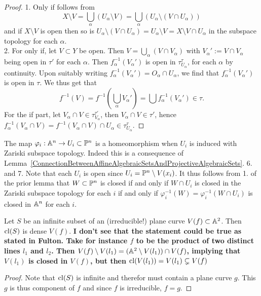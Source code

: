     \begin{proof}
        1. Only if follows from
        $$X\setminus V = \bigcup_\alpha (U_\alpha\setminus V)= \bigcup_\alpha (U_\alpha\setminus (V\cap U_\alpha))$$
        and if $X\setminus V$ is open then so is $U_\alpha\setminus (V\cap U_\alpha) = U_\alpha \setminus V = X\setminus V \cap U_\alpha$ in the subspace topology for each $\alpha$.\\
        2. For only if, let $V\subset Y$ be open. Then $V = \bigcup_\alpha (V\cap V_\alpha)$ with $V_\alpha':=V\cap V_\alpha$ being open in $\tau'$ for each $\alpha$. Then $f_\alpha^{-1}(V_\alpha')$ is open in $\tau_{U_\alpha}^\tau$, for each $\alpha$ by continuity. Upon suitably writing $f_\alpha^{-1}(V_\alpha')= O_\alpha\cap U_\alpha$, we find that $f_\alpha^{-1}(V_\alpha')$ is open in $\tau$. We thus get that
        $$f^{-1}(V)=f^{-1}\left(\bigcup_\alpha V_\alpha'\right)= \bigcup f_\alpha^{-1}(V_\alpha')\in \tau.$$
        For the if part, let $V_\alpha\cap V \in \tau_{V_\alpha}^{\tau'}$, then $V_\alpha \cap V\in \tau'$, hence $f_\alpha^{-1}(V_\alpha\cap V)= f^{-1}(V_\alpha\cap V)\cap U_\alpha \in \tau_{U_\alpha}^\tau$. 
    \end{proof}
    \begin{example}
        The map $\varphi_i : \mathbb{A}^n \rightarrow U_i \subset \mathbb{P}^n$ is a homeomorphism when $U_i$ is induced with Zariski subspace topology. Indeed this is a consequence of Lemma~\ref{ConnectionBetweenAffineAlgebraicSetsAndProjectiveAlgebraicSets}. 6. and 7. Note that each $U_i$ is open since $U_i = \mathbb{P}^n\setminus V(x_i)$. It thus follows from 1. of the prior lemma that $W\subset \mathbb{P}^n$ is closed if and only if $W\cap U_i$ is closed in the Zariski subspace topology for each $i$ if and only if $\varphi_i^{-1}(W)= \varphi_i^{-1}(W\cap U_i)$ is closed in $\mathbb{A}^n$ for each $i$. 
    \end{example}
    \begin{proposition}
        Let $S$ be an infinite subset of an (irreducible!) plane curve $V(f)\subset \mathbb{A}^2$. Then $\mathrm{cl}(S)$ is dense $V(f)$. \textbf{I don't see that the statement could be true as stated in Fulton. Take for instance $f$ to be the product of two distinct lines $l_1$ and $l_2$. Then $V(f)\setminus V(l_1) = (\mathbb{A}^2\setminus V(l_1))\cap V(f)$, implying that $V(l_1)$ is closed in $V(f)$, but then $\mathrm{cl}(V(l_1))=V(l_1)\subsetneq V(f)$}
    \end{proposition}
    \begin{proof}
        Note that $\mathrm{cl}(S)$ is infinite and therefor must contain a plane curve $g$. This $g$ is thus component of $f$ and since $f$ is irreducible, $f=g$.
    \end{proof}
